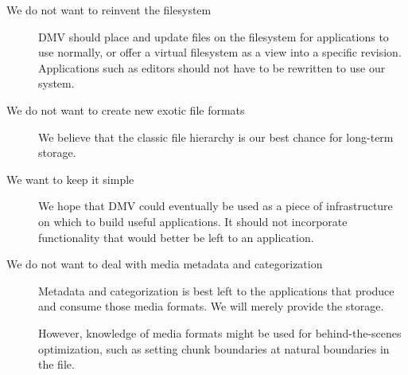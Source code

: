 \begin{description}

    \item[We do not want to reinvent the filesystem] DMV should place and update
        files on the filesystem for applications to use normally, or offer a
        virtual filesystem as a view into a specific revision. Applications such
        as editors should not have to be rewritten to use our system.

  \item[We do not want to create new exotic file formats] We believe that the
      classic file hierarchy is our best chance for long-term storage.

  \item[We want to keep it simple] We hope that DMV could eventually be used as
      a piece of infrastructure on which to build useful applications. It should
      not incorporate functionality that would better be left to an application.

  \item[We do not want to deal with media metadata and categorization] Metadata
      and categorization is best left to the applications that produce and
      consume those media formats. We will merely provide the storage.

      However, knowledge of media formats might be used for behind-the-scenes
      optimization, such as setting chunk boundaries at natural boundaries in
      the file.

\end{description}
